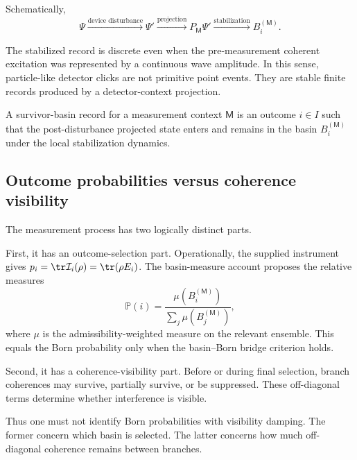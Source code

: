 \documentclass[11pt]{article}
\newcommand{\Meas}{\mathsf M}
\begin{document}
Schematically,
\begin{equation}
  \Psi
  \xrightarrow{\text{device disturbance}}
  \Psi'
  \xrightarrow{\text{projection}}
  P_{\Meas}\Psi'
  \xrightarrow{\text{stabilization}}
  B_i^{(\Meas)}.
  \label{eq:measurement-stabilization-chain}
\end{equation}

The stabilized record is discrete even when the pre-measurement coherent excitation was
represented by a continuous wave amplitude. In this sense, particle-like detector clicks are
not primitive point events. They are stable finite records produced by a detector-context
projection.

\begin{definition}
\label{def:survivor-basin-record}
A survivor-basin record for a measurement context \(\Meas\) is an outcome \(i\in I\) such that
the post-disturbance projected state enters and remains in the basin \(B_i^{(\Meas)}\) under
the local stabilization dynamics.
\end{definition}

\subsection{Outcome probabilities versus coherence visibility}
\label{subsec:outcome-vs-visibility}

The measurement process has two logically distinct parts.

First, it has an outcome-selection part. Operationally, the supplied instrument gives
\(p_i=\tr\mathcal I_i(\rho)=\tr(\rho E_i)\). The basin-measure account proposes the relative
measures
\begin{equation}
  \mathbb P(i)
  =
  \frac{\mu(B_i^{(\Meas)})}
  {\sum_j\mu(B_j^{(\Meas)})},
  \label{eq:basin-probabilities-measurement}
\end{equation}
where \(\mu\) is the admissibility-weighted measure on the relevant ensemble. This equals the
Born probability only when the basin--Born bridge criterion holds.

Second, it has a coherence-visibility part. Before or during final selection, branch coherences
may survive, partially survive, or be suppressed. These off-diagonal terms determine whether
interference is visible.

Thus one must not identify Born probabilities with visibility damping. The former concern
which basin is selected. The latter concerns how much off-diagonal coherence remains between
branches.
\end{document}
